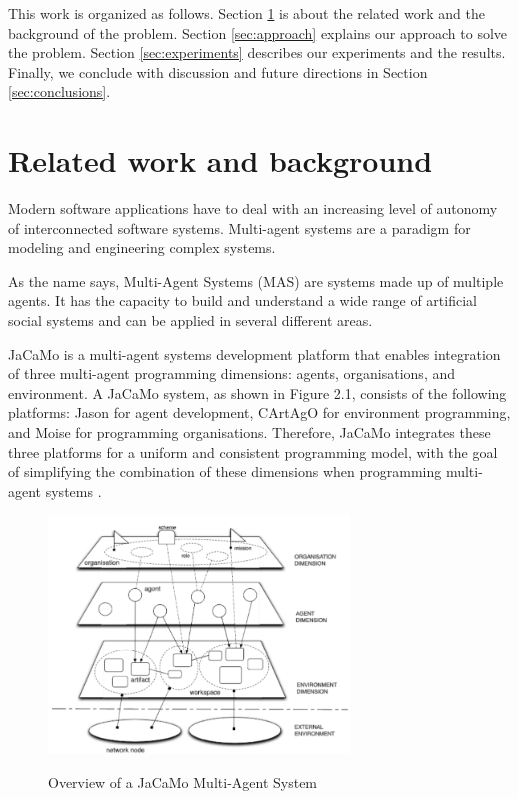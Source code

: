 \documentclass[letterpaper]{article}
\begin{document}
This work is organized as follows. Section \ref{sec:relatedwork} is about the related work and the background of the problem. Section \ref{sec:approach} explains our approach to solve the problem. Section \ref{sec:experiments} describes our experiments and the results. Finally, we conclude with discussion and future directions in Section \ref{sec:conclusions}.

\section{Related work and background}\label{sec:relatedwork}

Modern software applications have to deal with an increasing level of autonomy of interconnected software systems. Multi-agent systems are a paradigm for modeling and engineering complex systems. \cite{boissier2020multi}

As the name says, Multi-Agent Systems (MAS) are systems made up of multiple agents. It has the capacity to build and understand a wide range of artificial social systems and can be applied in several different areas.\cite{wooldridge2009introduction}

JaCaMo \cite{boissier2013multi} is a multi-agent systems development platform that enables integration of three multi-agent programming dimensions: agents, organisations, and environment. A JaCaMo system, as shown in Figure 2.1, consists of the following platforms: Jason \cite{bordini2007programming} for agent development, CArtAgO \cite{bordini2009multi} for environment programming, and Moise \cite{hubner2007developing} for programming organisations. Therefore, JaCaMo integrates these three platforms for a uniform and consistent programming model, with the goal of simplifying the combination of these dimensions when programming multi-agent systems \cite{boissier2013multi}.

\begin{figure}[ht]
    \centering
    \includegraphics[width=8cm]{images/jacamo_overview.png}
    \caption{Overview of a JaCaMo Multi-Agent System}
    \cite{boissier2013multi}
    \label{fig:jacamo-overview}
\end{figure}
\end{document}
